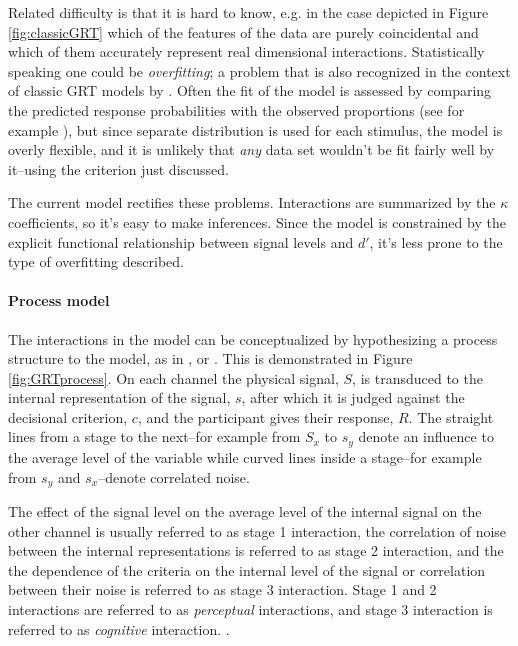 \documentclass{article}\usepackage{knitr}
\begin{document}
Related difficulty is that it is hard to know, e.g. in the case depicted in Figure \ref{fig:classicGRT} which of the features of the data are purely coincidental and which of them accurately represent real dimensional interactions. Statistically speaking one could be \textit{overfitting}; a problem that is also recognized in the context of classic GRT models by \cite{soto2017}. Often the fit of the model is assessed by comparing the predicted response probabilities with the observed proportions (see for example \citet[Figure 4]{silbert2009}), but since separate distribution is used for each stimulus, the model is overly flexible, and it is unlikely that \textit{any} data set wouldn't be fit fairly well by it--using the criterion just discussed.

The current model rectifies these problems. Interactions are summarized by the $\kappa$ coefficients, so it's easy to make inferences. Since the model is constrained by the explicit functional relationship between signal levels and $d'$, it's less prone to the type of overfitting described. 

\paragraph{Process model}

The interactions in the model can be conceptualized by hypothesizing a process structure to the model, as in \cite{ashby1989}, \cite{ashby2000} or \cite{cohen2003}. This is demonstrated in Figure \ref{fig:GRTprocess}. On each channel the physical signal, $S$, is transduced to the internal representation of the signal, $s$, after which it is judged against the decisional criterion, $c$, and the participant gives their response, $R$. The straight lines from a stage to the next--for example from $S_x$ to $s_y$ denote an influence to the average level of the variable while curved lines inside a stage--for example from $s_y$ and $s_x$--denote correlated noise. 

The effect of the signal level on the average level of the internal signal on the other channel is usually referred to as stage 1 interaction, the correlation of noise between the internal representations is referred to as stage 2 interaction, and the the dependence of the criteria on the internal level of the signal or correlation between their noise is referred to as stage 3 interaction. Stage 1 and 2 interactions are referred to as \textit{perceptual} interactions, and stage 3 interaction is referred to as \textit{cognitive} interaction. \citep{ashby1989, ashby2000, cohen2003}. 
\end{document}
